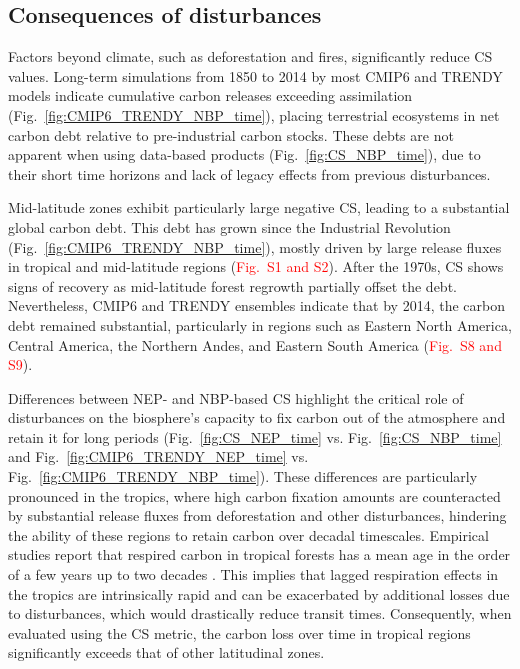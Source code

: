 \documentclass[ProofPDF]{./Styles/Jnls-Template-V3}
\begin{document}
\subsection{Consequences of disturbances}
Factors beyond climate, such as deforestation and fires, significantly reduce CS values. Long-term simulations from 1850 to 2014 by most CMIP6 and TRENDY models indicate cumulative carbon releases exceeding assimilation (Fig.~\ref{fig:CMIP6_TRENDY_NBP_time}), placing terrestrial ecosystems in net carbon debt relative to pre-industrial carbon stocks. These debts are not apparent when using data-based products (Fig.~\ref{fig:CS_NBP_time}), due to their short time horizons and lack of legacy effects from previous disturbances. 

Mid-latitude zones exhibit particularly large negative CS, leading to a substantial global carbon debt. This debt has grown since the Industrial Revolution (Fig.~\ref{fig:CMIP6_TRENDY_NBP_time}), mostly driven by large release fluxes in tropical and mid-latitude regions (\textcolor{red}{Fig.~S1 and S2}). After the 1970s, CS shows signs of recovery as mid-latitude forest regrowth partially offset the debt. 
Nevertheless, CMIP6 and TRENDY ensembles indicate that by 2014, the carbon debt remained substantial, particularly in regions such as Eastern North America, Central America, the Northern Andes, and Eastern South America (\textcolor{red}{Fig.~S8 and S9}).

Differences between NEP- and NBP-based CS highlight the critical role of disturbances on the biosphere's capacity to fix carbon out of the atmosphere and retain it for long periods (Fig.~\ref{fig:CS_NEP_time} vs. Fig.~\ref{fig:CS_NBP_time} and Fig.~\ref{fig:CMIP6_TRENDY_NEP_time} vs. Fig.~\ref{fig:CMIP6_TRENDY_NBP_time}). These differences are particularly pronounced in the tropics, where high carbon fixation amounts are counteracted by substantial release fluxes from deforestation and other disturbances, hindering the ability of these regions to retain carbon over decadal timescales. Empirical studies report that respired carbon in tropical forests has a mean age in the order of a few years up to two decades \citep{Sierra2021JE,Chanca2025}. This implies that lagged respiration effects in the tropics are intrinsically rapid and can be exacerbated by additional losses due to disturbances, which would drastically reduce transit times. Consequently, when evaluated using the CS metric, the carbon loss over time in tropical regions significantly exceeds that of other latitudinal zones. 
\end{document}
